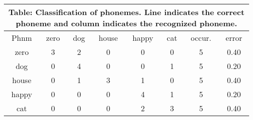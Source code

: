 \documentclass[10pt]{article}
\begin{document}
\tiny
\begin{tabular}{|@{}c@{}||@{}c@{}|@{}c@{}|@{}c@{}|@{}c@{}|@{}c@{}|@{}c@{}|@{}c@{}|}
\hline
\multicolumn{8}{c}{Table: Classification of phonemes. Line indicates the correct phoneme and column indicates the recognized phoneme.} \\ \hline \hline
Phnm & zero & dog & house & happy & cat & occur. & error \\ \hline
zero & 3 & 2 & 0 & 0 & 0 & 5 & 0.40 \\ \hline
dog & 0 & 4 & 0 & 0 & 1 & 5 & 0.20 \\ \hline
house & 0 & 1 & 3 & 1 & 0 & 5 & 0.40 \\ \hline
happy & 0 & 0 & 0 & 4 & 1 & 5 & 0.20 \\ \hline
cat & 0 & 0 & 0 & 2 & 3 & 5 & 0.40 \\ \hline
\end{tabular}
\end{document}
